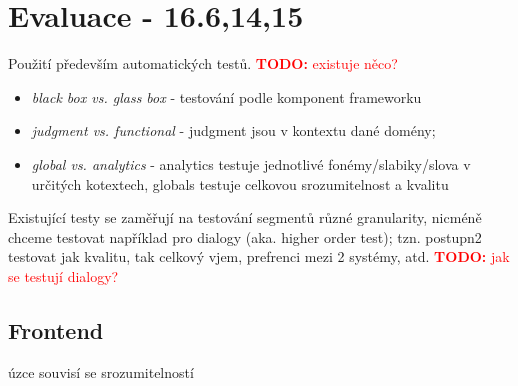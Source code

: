 \documentclass{article}
\newcommand{\td}[1]{\textcolor{red}{\textbf{TODO:} #1}}
\begin{document}
\section*{Evaluace - \cite{huang2001spoken}16.6,14,15}
Použití především automatických testů. \td{existuje něco?}
\begin{itemize}
\item\textit{black box vs. glass box} - testování podle komponent frameworku
\item \textit{judgment vs. functional} - judgment jsou v kontextu dané domény;
\item\textit{global vs. analytics} - analytics testuje jednotlivé fonémy/slabiky/slova v určitých kotextech, globals testuje celkovou srozumitelnost a kvalitu
\end{itemize}
Existující testy se zaměřují na testování segmentů různé granularity, nicméně chceme testovat například pro dialogy (aka. higher order test); tzn. postupn2 testovat jak kvalitu, tak celkový vjem, prefrenci mezi 2 systémy, atd. \td{jak se testují dialogy?}
\subsection*{Frontend} úzce souvisí se srozumitelností
\end{document}
